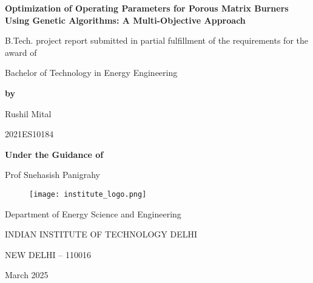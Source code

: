 \documentclass[12pt]{report}
\begin{document}
\begin{titlepage}
    \centering

    {\Huge \textbf{Optimization of Operating Parameters for Porous Matrix Burners Using Genetic Algorithms: A Multi-Objective Approach}\par}
    \vspace{1cm} %
    
    {\Large B.Tech. project report submitted in partial fulfillment of the requirements for the award of}\par
    
    {\Large Bachelor of Technology in Energy Engineering}\par
    
    \vspace{0.5cm}
    
    \textbf{by}\par
    {\Large Rushil Mital}\par
    \vspace{0.25cm}
    {\Large 2021ES10184}\par
    
    \vspace{0.25cm} %
    
    \textbf{Under the Guidance of}\par
    {\Large Prof Snehasish Panigrahy}\par
    
    \vspace{0.5cm} %

    \begin{figure}[H]
        \centering
        \texttt{[image: institute\_logo.png]} %
    \end{figure}
    
    {\Large Department of Energy Science and Engineering}\par
    \vspace{0.25cm}
    {\Large INDIAN INSTITUTE OF TECHNOLOGY DELHI}\par
    \vspace{0.25cm}
    {\Large NEW DELHI – 110016}\par
    {\Large March 2025}\par

\end{titlepage}
\end{document}
